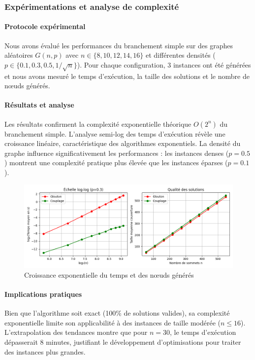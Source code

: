 \documentclass[11pt,a4paper]{article}
\begin{document}
\subsubsection{Expérimentations et analyse de complexité}

\paragraph{Protocole expérimental}
Nous avons évalué les performances du branchement simple sur des graphes aléatoires $G(n,p)$ avec $n \in \{8,10,12,14,16\}$ et différentes densités ($p \in \{0.1,0.3,0.5,1/\sqrt{n}\}$). Pour chaque configuration, 3 instances ont été générées et nous avons mesuré le temps d'exécution, la taille des solutions et le nombre de nœuds générés.

\paragraph{Résultats et analyse}
Les résultats confirment la complexité exponentielle théorique $O(2^n)$ du branchement simple. L'analyse semi-log des temps d'exécution révèle une croissance linéaire, caractéristique des algorithmes exponentiels. La densité du graphe influence significativement les performances : les instances denses ($p=0.5$) montrent une complexité pratique plus élevée que les instances éparses ($p=0.1$).

\begin{figure}[H]
  \centering
  \includegraphics[width=0.8\linewidth]{Figure_1.png}
  \caption{Croissance exponentielle du temps et des nœuds générés}
  \label{fig:branchtime}
\end{figure}

\paragraph{Implications pratiques}
Bien que l'algorithme soit exact (100\% de solutions valides), sa complexité exponentielle limite son applicabilité à des instances de taille modérée ($n \leq 16$). L'extrapolation des tendances montre que pour $n=30$, le temps d'exécution dépasserait 8 minutes, justifiant le développement d'optimisations pour traiter des instances plus grandes.
\end{document}

